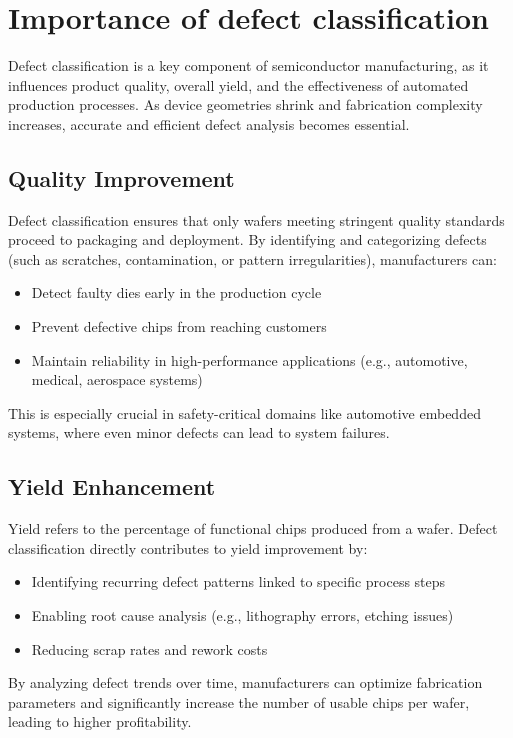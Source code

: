 \section{Importance of defect classification}
Defect classification is a key component of semiconductor manufacturing, as it influences product quality, overall yield, and the effectiveness of automated production processes. As device geometries shrink and fabrication complexity increases, accurate and efficient defect analysis becomes essential.

\subsection {Quality Improvement}

Defect classification ensures that only wafers meeting stringent quality standards proceed to packaging and deployment. By identifying and categorizing defects (such as scratches, contamination, or pattern irregularities), manufacturers can:
\begin{itemize}
\item Detect faulty dies early in the production cycle
\item Prevent defective chips from reaching customers
\item Maintain reliability in high-performance applications (e.g., automotive, medical, aerospace systems)
\end{itemize}

This is especially crucial in safety-critical domains like automotive embedded systems, where even minor defects can lead to system failures.

\subsection {Yield Enhancement}

Yield refers to the percentage of functional chips produced from a wafer. Defect classification directly contributes to yield improvement by:
\begin{itemize}
\item Identifying recurring defect patterns linked to specific process steps
\item Enabling root cause analysis (e.g., lithography errors, etching issues)
\item Reducing scrap rates and rework costs
\end{itemize} 

By analyzing defect trends over time, manufacturers can optimize fabrication parameters and significantly increase the number of usable chips per wafer, leading to higher profitability.

